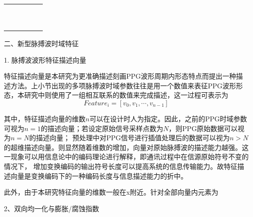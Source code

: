 \begin{center}
\begin{longtable}{p{1.57cm}<{\centering}p{4.07cm}<{\centering}p{2.07cm}<{\centering}p{4.07cm}<{\centering}p{2.07cm}<{\centering}}
        &       &       &       &  \\
        &       &       &       &  \\
        &       &       &       &  \\
        &       &       &       &  \\
        &       &       &       &  \\
        &       &       &       &  \\
        &       &       &       &  \\
        &       &       &       &  \\
        &       &       &       &  \\
	\end{longtable}
\end{center}

二、新型脉搏波时域特征

1. 脉搏波波形特征描述向量

特征描述向量是本研究为更准确描述刻画PPG波形周期内形态特点而提出一种描述方法。上小节出现的多项脉搏波时域参数往往是用一个数值来表征PPG波形形态，本研究中则使用了一组相互联系的数值来完成描述，这一过程可表示为
\begin{equation}
    \label{equ:featurevector}
    Feature_i=[v_0,v_1,\cdots,v_{n-1}]
\end{equation}

其中，特征描述向量的维数$n$可以在设计时人为指定。因此，之前的PPG时域参数可视为$n=1$的描述向量；若设定原始信号采样点数为$N$，则PPG原始数据可以视为$n=N$的描述向量；
预处理中对PPG信号进行插值处理后的数据可以视为$n>N$的超维描述向量。则显然随着维数的增加，向量对原始脉搏波的描述能力越强。这一现象可以用信息论中的编码理论进行解释，即通讯过程中在信源原始符号不变的情况下，
增加变换编码的输出符号长度可以提高系统的信息传输能力\cite{Zhao2017}。故特征描述向量是变换编码下的一种编码长度与信息描述能力的折中。

此外，由于本研究特征向量的维数一般在x附近。针对全部向量内元素为

2、双向均一化与膨胀/腐蚀指数

